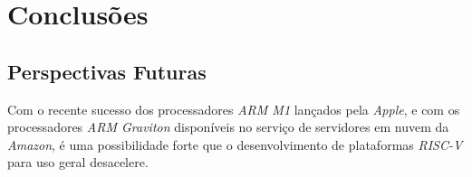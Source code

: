 \chapter{Conclusões}\label{cap5_conclusoes}


\section{Perspectivas Futuras}

    { Com o recente sucesso dos processadores \textit{ARM M1} lançados pela
        \textit{Apple}, e com os processadores \textit{ARM Graviton} disponíveis
        no serviço de servidores em nuvem da \textit{Amazon}, é uma possibilidade
        forte que o desenvolvimento de plataformas \textit{RISC-V} para uso geral
        desacelere.
    }


